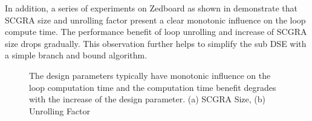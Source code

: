 In addition, a series of experiments on Zedboard \cite{zedboard} as 
shown in  demonstrate that SCGRA size and 
unrolling factor present a clear monotonic influence on the 
loop compute time. The performance benefit of loop unrolling and 
increase of SCGRA size drops gradually. This observation further helps to simplify the sub DSE with
a simple branch and bound algorithm.



\begin{figure}[tb]
    \caption{The design parameters typically have monotonic influence on the
        loop computation time and the computation time benefit degrades with 
        the increase of the design parameter. (a) SCGRA Size, (b) Unrolling Factor}
    \label{fig:observation}
  \end{figure}


